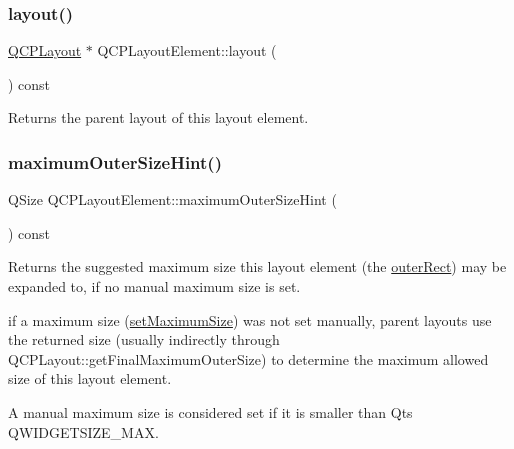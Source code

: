 \mbox{\label{classQCPLayoutElement_a4efdcbde9d28f410e5ef166c9d691deb}} 
\subsubsection{\texorpdfstring{layout()}{layout()}}
{\footnotesize\ttfamily \hyperlink{classQCPLayout}{Q\+C\+P\+Layout} $\ast$ Q\+C\+P\+Layout\+Element\+::layout (\begin{DoxyParamCaption}{ }\end{DoxyParamCaption}) const\hspace{0.3cm}{\ttfamily [inline]}}

Returns the parent layout of this layout element. \mbox{\label{classQCPLayoutElement_ad96efb977a26e360e8a64a4c1e56456d}} 
\subsubsection{\texorpdfstring{maximum\+Outer\+Size\+Hint()}{maximumOuterSizeHint()}}
{\footnotesize\ttfamily Q\+Size Q\+C\+P\+Layout\+Element\+::maximum\+Outer\+Size\+Hint (\begin{DoxyParamCaption}{ }\end{DoxyParamCaption}) const\hspace{0.3cm}{\ttfamily [virtual]}}

Returns the suggested maximum size this layout element (the \hyperlink{classQCPLayoutElement_a2a32a12a6161c9dffbadeb9cc585510c}{outer\+Rect}) may be expanded to, if no manual maximum size is set.

if a maximum size (\hyperlink{classQCPLayoutElement_a74eb5280a737ab44833d506db65efd95}{set\+Maximum\+Size}) was not set manually, parent layouts use the returned size (usually indirectly through Q\+C\+P\+Layout\+::get\+Final\+Maximum\+Outer\+Size) to determine the maximum allowed size of this layout element.

A manual maximum size is considered set if it is smaller than Qt\textquotesingle{}s {\ttfamily Q\+W\+I\+D\+G\+E\+T\+S\+I\+Z\+E\+\_\+\+M\+AX}.

